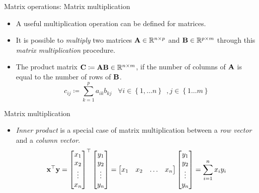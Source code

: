 \documentclass[aspectratio=169]{beamer}
\let\olditem\item
\renewcommand{\item}{\setlength{\itemsep}{\fill}\olditem}
\def\mf{\ensuremath\mathbf}
\begin{document}
\begin{frame}[t]{Matrix operations: Matrix multiplication}
\begin{itemize}
\item A useful multiplication operation can be defined for matrices.
\item It is possible to \textit{multiply} two matrices $\mf{A} \in \mathbb{R}^{n\times p}$ and $\mf{B} \in \mathbb{R}^{p\times m}$ through this \textit{matrix multiplication} procedure.
\item The product matrix $\mf{C} \coloneqq \mf{A}\mf{B} \in \mathbb{R}^{n \times m}$, if the number of columns of $\mf{A}$ is equal to the number of rows of $\mf{B}$.
\[ c_{ij} \coloneqq \sum_{k=1}^{p} a_{ik}b_{kj} \,\,\,\,\, \forall i \in \left\{1, \ldots n\right\}\,\,\, , j \in \left\{1 \ldots m\right\} \]
\end{itemize}
\end{frame}

\begin{frame}[t]{Matrix multiplication}
\begin{itemize}
\item \textit{Inner product} is a special case of matrix multiplication between a \textit{row vector} and a \textit{column vector}.
\[ \mf{x}^{\top}\mf{y} = \begin{bmatrix}
x_1 \\ x_2 \\ \vdots \\x_n
\end{bmatrix}^{\top}\begin{bmatrix}
y_1 \\ y_2 \\ \vdots \\y_n
\end{bmatrix} = \begin{bmatrix}
x_1 & x_2 & \ldots &x_n
\end{bmatrix}\begin{bmatrix}
y_1 \\ y_2 \\ \vdots \\y_n
\end{bmatrix} = \sum_{i=1}^nx_iy_i\]
\end{itemize}
\end{frame}
\end{document}

